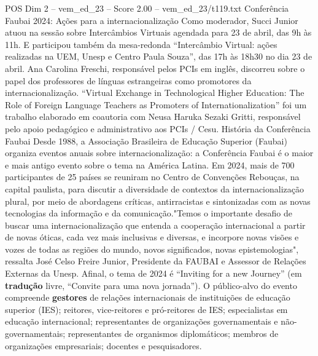 \begin{textsample}{POS Dim 2 – vem\_ed\_23 – Score 2.00 – vem\_ed\_23/t119.txt}  \label{ex:f2_pos_115}
Conferência Faubai 2024: Ações para a internacionalização Como moderador, Succi Junior atuou na sessão sobre Intercâmbios Virtuais agendada para 23 de abril, das 9h às 11h.
E participou também da mesa-redonda “Intercâmbio Virtual: ações realizadas na UEM, Unesp e Centro Paula Souza”, das 17h às 18h30 no dia 23 de abril.
Ana Carolina Freschi, responsável pelos PCIs em inglês, discorreu sobre o papel dos professores de línguas estrangeiras como promotores da internacionalização. “Virtual Exchange in Technological Higher Education: The Role of Foreign Language Teachers as Promoters of Internationalization” foi um trabalho elaborado em coautoria com Neusa Haruka Sezaki Gritti, responsável pelo apoio pedagógico e administrativo aos PCIs / Cesu.
História da Conferência Faubai Desde 1988, a Associação Brasileira de Educação Superior (Faubai) organiza eventos anuais sobre internacionalização: a Conferência Faubai é o maior e mais antigo evento sobre o tema na América Latina.
Em 2024, mais de 700 participantes de 25 países se reuniram no Centro de Convenções Rebouças, na capital paulista, para discutir a diversidade de contextos da internacionalização plural, por meio de abordagens críticas, antirracistas e sintonizadas com as novas tecnologias da informação e da comunicação."Temos o importante desafio de buscar uma internacionalização que entenda a cooperação internacional a partir de novas óticas, cada vez mais inclusivas e diversas, e incorpore novas visões e vozes de todas as regiões do mundo, novos significados, novas epistemologias", ressalta José Celso Freire Junior, Presidente da FAUBAI e Assessor de Relações Externas da Unesp.
Afinal, o tema de 2024 é “Inviting for a new Journey” (em \textbf{tradução} livre, “Convite para uma nova jornada”).
O público-alvo do evento compreende \textbf{gestores} de relações internacionais de instituições de educação superior (IES); reitores, vice-reitores e pró-reitores de IES; especialistas em educação internacional; representantes de organizações governamentais e não-governamentais; representantes de organismos diplomáticos; membros de organizações empresariais; docentes e pesquisadores.

\end{textsample}
